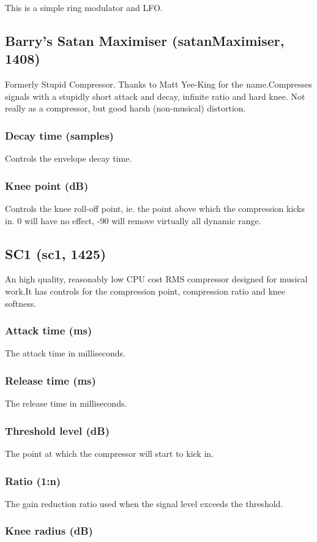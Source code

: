 \documentclass[11pt]{article}
\begin{document}
This is a simple ring modulator and LFO.\subsection{Barry's Satan Maximiser (satanMaximiser, 1408)\label{satanMaximiser}\label{id1408}}
Formerly Stupid Compressor. Thanks to Matt Yee-King for the name.Compresses signals with a stupidly short attack and decay, infinite
ratio and hard knee. Not really as a compressor, but good harsh (non-musical)
distortion.\subsubsection*{Decay time (samples)}
Controls the envelope decay time.\subsubsection*{Knee point (dB)}
Controls the knee roll-off point, ie. the point above which the compression kicks in. 0 will have no effect, -90 will remove virtually all dynamic range.\subsection{SC1 (sc1, 1425)\label{sc1}\label{id1425}}
An high quality, reasonably low CPU cost RMS compressor designed for musical work.It has controls for the compression point, compression ratio and knee softness.\subsubsection*{Attack time (ms)}
The attack time in milliseconds.\subsubsection*{Release time (ms)}
The release time in milliseconds.\subsubsection*{Threshold level (dB)}
The point at which the compressor will start to kick in.\subsubsection*{Ratio (1:n)}
The gain reduction ratio used when the signal level exceeds the threshold.\subsubsection*{Knee radius (dB)}
\end{document}
